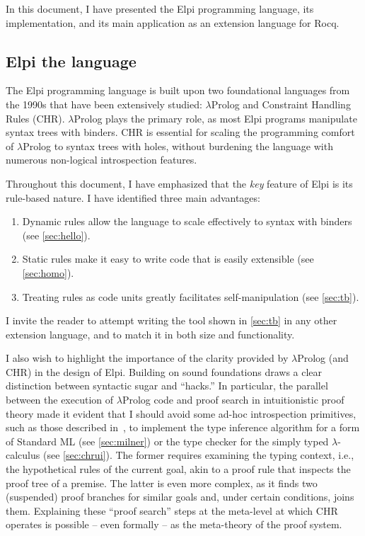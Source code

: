 \documentclass{these-ISSS}
\begin{document}
In this document, I have presented the Elpi programming language, its
implementation, and its main application as an extension language for Rocq.

\subsection{Elpi the language}

The Elpi programming language is built upon two foundational languages from the
1990s that have been extensively studied: $\lambda$Prolog and Constraint
Handling Rules (CHR). $\lambda$Prolog plays the primary role, as most Elpi
programs manipulate syntax trees with binders. CHR is essential for scaling the
programming comfort of $\lambda$Prolog to syntax trees with holes, without
burdening the language with numerous non-logical introspection features.

Throughout this document, I have emphasized that the \emph{key} feature of Elpi
is its rule-based nature. I have identified three main advantages:
\begin{enumerate}
\item Dynamic rules allow the language to scale effectively to syntax with binders (see \cref{sec:hello}).
\item Static rules make it easy to write code that is easily extensible (see \cref{sec:homo}).
\item Treating rules as code units greatly facilitates self-manipulation (see \cref{sec:tb}).
\end{enumerate}

I invite the reader to attempt writing the  tool shown in
\cref{sec:tb} in any other extension language, and to match it in both
size and functionality.

I also wish to highlight the importance of the clarity provided by
$\lambda$Prolog (and CHR) in the design of Elpi. Building on sound foundations
draws a clear distinction between syntactic sugar and ``hacks.'' In particular,
the parallel between the execution of $\lambda$Prolog code and proof search in
intuitionistic proof theory made it evident that I should avoid 
some ad-hoc introspection primitives, such as those described in~\cite[Section 8 and
later]{10.1145/3236788}, to implement the type inference algorithm for a form
of Standard ML (see \cref{sec:milner}) or the type checker for the
simply typed $\lambda$-calculus (see \cref{sec:chrui}). The former
requires examining the typing context, i.e., the hypothetical rules of the
current goal, akin to a proof rule that inspects the proof tree of a premise.
The latter is even more complex, as it finds two (suspended) proof branches for
similar goals and, under certain conditions, joins them. Explaining these
``proof search'' steps at the meta-level at which CHR operates is possible -- even
formally -- as the meta-theory of the proof system.
\end{document}
